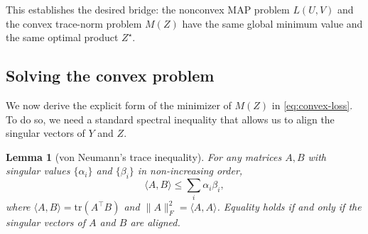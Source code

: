\documentclass[11pt]{article}
\theoremstyle{spaced}
\newtheorem{lemma}{Lemma}
\begin{document}
This establishes the desired bridge: the nonconvex MAP problem \(L(U,V)\) and the convex trace-norm problem \(M(Z)\) have the same global minimum value and the same optimal product \(Z^\star\).

\subsection*{Solving the convex problem}

We now derive the explicit form of the minimizer of \(M(Z)\) in \eqref{eq:convex-loss}.  
To do so, we need a standard spectral inequality that allows us to align the singular vectors of \(Y\) and \(Z\).

\begin{lemma}[von Neumann's trace inequality]
For any matrices \(A,B\) with singular values \(\{\alpha_i\}\) and \(\{\beta_i\}\) in non-increasing order,
\[
\langle A,B \rangle
\le
\sum_i \alpha_i \beta_i,
\]
where \(\langle A,B\rangle = \mathrm{tr}(A^\top B)\) and \(\|A\|_F^2 = \langle A,A\rangle\).
Equality holds if and only if the singular vectors of \(A\) and \(B\) are aligned.
\end{lemma}
\end{document}
